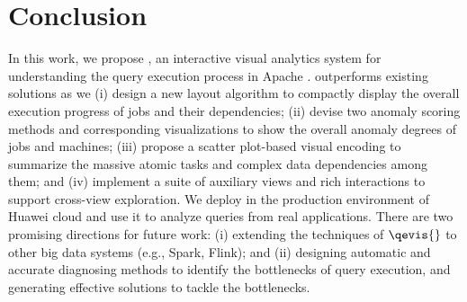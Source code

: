 \section{Conclusion}\label{sec:con}
In this work, we propose \qevis{}, an interactive visual analytics system for understanding the query execution process in Apache \hive{}. 
\qevis{} outperforms existing solutions as we (i) design a new layout algorithm to compactly display the overall execution progress of jobs and their dependencies; (ii) devise two anomaly scoring methods and corresponding visualizations to show the overall anomaly degrees of jobs and machines; (iii) propose a scatter plot-based visual encoding to summarize the massive atomic tasks and complex data dependencies among them; and (iv) implement a suite of auxiliary views and rich interactions to support cross-view exploration.
We deploy \qevis{} in the production environment of Huawei cloud and use it to analyze queries from real applications.
There are two promising directions for future work: (i) extending the techniques of $\qevis{}$ to other big data systems (e.g., Spark, Flink); and (ii) designing automatic and accurate diagnosing methods to identify the bottlenecks of query execution, and generating effective solutions to tackle the bottlenecks. 
